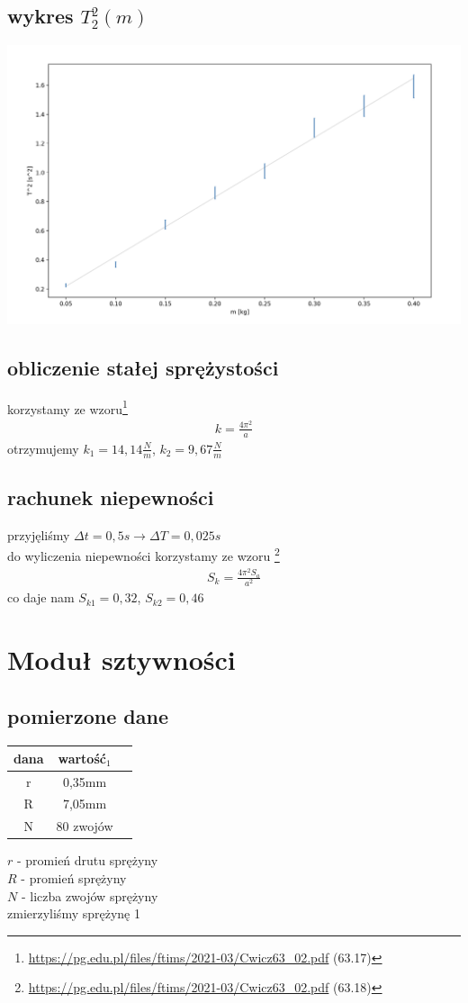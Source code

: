 \documentclass{article}
\begin{document}
\subsection{wykres $T_2^2(m)$}
\includegraphics[width=15cm]{m7_2_2}

\subsection{obliczenie stałej sprężystości}

korzystamy ze wzoru\footnote{\url{https://pg.edu.pl/files/ftims/2021-03/Cwicz63_02.pdf} (63.17)}
\begin{gather*}
	k = \frac{4\pi^2}{a}
\end{gather*} 
otrzymujemy $k_1=14,14 \frac{N}{m}$, $k_2 = 9,67 \frac{N}{m}$
\subsection{rachunek niepewności}
przyjęliśmy $\Delta t = 0,5s \rightarrow \Delta T = 0,025s$  \\
do wyliczenia niepewności korzystamy ze wzoru \footnote{\url{https://pg.edu.pl/files/ftims/2021-03/Cwicz63_02.pdf} (63.18)}
\begin{gather*}
	S_k = \frac{4\pi^2 S_a}{a^2}
\end{gather*} 
co daje nam $S_{k1} = 0,32$, $S_{k2} = 0,46$

\section{Moduł sztywności}
\subsection{pomierzone dane}
\begin{center}
\begin{tabular}{ c | c  | c}
dana & wartość$_1$\\
\hline
 r & 0,35mm \\
 R & 7,05mm \\ 
 N & 80 zwojów \\ 

\end{tabular}
\end{center}
$r$ - promień drutu sprężyny \\
$R$ - promień sprężyny \\
$N$ - liczba zwojów sprężyny \\
zmierzyliśmy sprężynę 1
\end{document}
